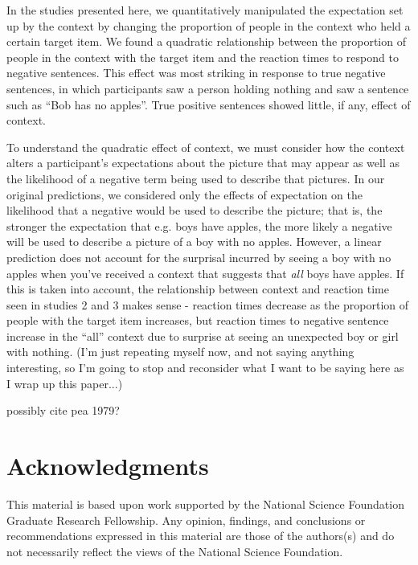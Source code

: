 \documentclass[10pt,letterpaper]{article}
\begin{document}
In the studies presented here, we quantitatively manipulated the expectation set up by the context by changing the proportion of people in the context who held a certain target item.  We found a quadratic relationship between the proportion of people in the context with the target item and the reaction times to respond to negative sentences.  This effect was most striking in response to true negative sentences, in which participants saw a person holding nothing and saw a sentence such as ``Bob has no apples''.  True positive sentences showed little, if any, effect of context.  

To understand the quadratic effect of context, we must consider how the context alters a participant's expectations about the picture that may appear as well as the likelihood of a negative term being used to describe that pictures.  In our original predictions, we considered only the effects of expectation on the likelihood that a negative would be used to describe the picture; that is, the stronger the expectation that e.g. boys have apples, the more likely a negative will be used to describe a picture of a boy with no apples.  However, a linear prediction does not account for the surprisal incurred by seeing a boy with no apples when you've received a context that suggests that \emph{all} boys have apples.  If this is taken into account, the relationship between context and reaction time seen in studies 2 and 3 makes sense - reaction times decrease as the proportion of people with the target item increases, but reaction times to negative sentence increase in the ``all'' context due to surprise at seeing an unexpected boy or girl with nothing.  (I'm just repeating myself now, and not saying anything interesting, so I'm going to stop and reconsider what I want to be saying here as I wrap up this paper...)


possibly cite pea 1979?



\section{Acknowledgments}
This material is based upon work supported by the National Science Foundation Graduate Research Fellowship. Any opinion, findings, and conclusions or recommendations expressed in this material are those of the authors(s) and do not necessarily reflect the views of the National Science Foundation.




\setlength{\bibleftmargin}{.125in}
\setlength{\bibindent}{-\bibleftmargin}


\end{document}
